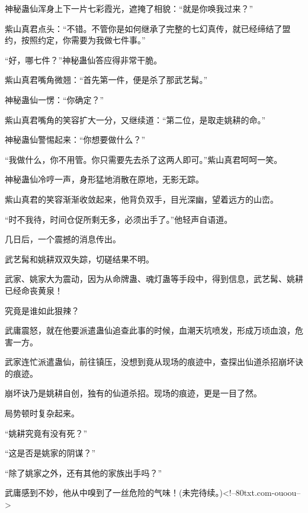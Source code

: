 \begin{this_body}
神秘蛊仙浑身上下一片七彩霞光，遮掩了相貌：“就是你唤我过来？”

紫山真君点头：“不错。不管你是如何继承了完整的七幻真传，就已经缔结了盟约，按照约定，你需要为我做七件事。”

“好，哪七件？”神秘蛊仙答应得非常干脆。

紫山真君嘴角微翘：“首先第一件，便是杀了那武艺髯。”

神秘蛊仙一愣：“你确定？”

紫山真君嘴角的笑容扩大一分，又继续道：“第二位，是取走姚耕的命。”

神秘蛊仙警惕起来：“你想要做什么？”

“我做什么，你不用管。你只需要先去杀了这两人即可。”紫山真君呵呵一笑。

神秘蛊仙冷哼一声，身形猛地消散在原地，无影无踪。

紫山真君的笑容渐渐收敛起来，他背负双手，目光深幽，望着远方的山峦。

“时不我待，时间仓促所剩无多，必须出手了。”他轻声自语道。

几日后，一个震撼的消息传出。

武艺髯和姚耕双双失踪，切磋结果不明。

武家、姚家大为震动，因为从命牌蛊、魂灯蛊等手段中，得到信息，武艺髯、姚耕已经命丧黄泉！

究竟是谁如此狠辣？

武庸震怒，就在他要派遣蛊仙追查此事的时候，血潮天坑喷发，形成万顷血浪，危害一方。

武家连忙派遣蛊仙，前往镇压，没想到竟从现场的痕迹中，查探出仙道杀招崩坏诀的痕迹。

崩坏诀乃是姚耕自创，独有的仙道杀招。现场的痕迹，更是一目了然。

局势顿时复杂起来。

“姚耕究竟有没有死？”

“这是否是姚家的阴谋？”

“除了姚家之外，还有其他的家族出手吗？”

武庸感到不妙，他从中嗅到了一丝危险的气味！(未完待续。)<!--80txt.com-ouoou-->

\end{this_body}

